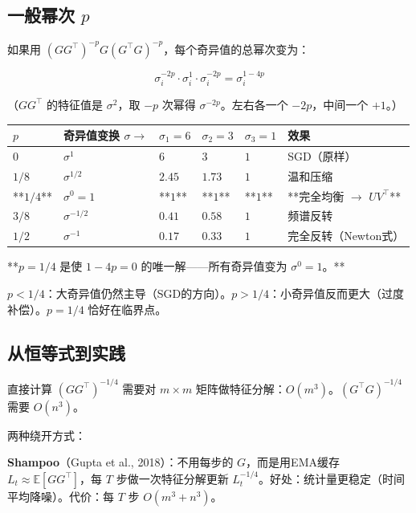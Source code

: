 \documentclass[12pt,a4paper]{article}
\begin{document}
\subsection{一般幂次 $p$}

如果用 $(GG^\top)^{-p}G(G^\top G)^{-p}$，每个奇异值的总幂次变为：


\[\sigma_i^{-2p} \cdot \sigma_i^1 \cdot \sigma_i^{-2p} = \sigma_i^{1-4p}\]

（$GG^\top$ 的特征值是 $\sigma^2$，取 $-p$ 次幂得 $\sigma^{-2p}$。左右各一个 $-2p$，中间一个 $+1$。）








\begin{center}\small
\begin{longtable}{|l|l|l|l|l|l|}
\hline
$p$ & 奇异值变换 $\sigma \to$ & $\sigma_1=6$ & $\sigma_2=3$ & $\sigma_3=1$ & 效果 \\
\hline
$0$ & $\sigma^1$ & $6$ & $3$ & $1$ & SGD（原样） \\
$1/8$ & $\sigma^{1/2}$ & $2.45$ & $1.73$ & $1$ & 温和压缩 \\
**$1/4$** & $\sigma^0 = 1$ & **$1$** & **$1$** & **$1$** & **完全均衡 $\to$ $UV^\top$** \\
$3/8$ & $\sigma^{-1/2}$ & $0.41$ & $0.58$ & $1$ & 频谱反转 \\
$1/2$ & $\sigma^{-1}$ & $0.17$ & $0.33$ & $1$ & 完全反转（Newton式） \\
\hline
\end{longtable}
\end{center}


**$p = 1/4$ 是使 $1 - 4p = 0$ 的唯一解——所有奇异值变为 $\sigma^0 = 1$。**

$p < 1/4$：大奇异值仍然主导（SGD的方向）。$p > 1/4$：小奇异值反而更大（过度补偿）。$p = 1/4$ 恰好在临界点。


\subsection{从恒等式到实践}

直接计算 $(GG^\top)^{-1/4}$ 需要对 $m \times m$ 矩阵做特征分解：$O(m^3)$。$(G^\top G)^{-1/4}$ 需要 $O(n^3)$。

两种绕开方式：

\textbf{Shampoo}（Gupta et al., 2018）：不用每步的 $G$，而是用EMA缓存 $L_t \approx \mathbb{E}[GG^\top]$，每 $T$ 步做一次特征分解更新 $L_t^{-1/4}$。好处：统计量更稳定（时间平均降噪）。代价：每 $T$ 步 $O(m^3+n^3)$。
\end{document}
